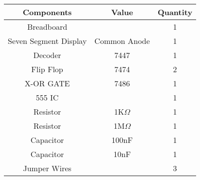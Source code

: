 
\begin{tabular}{|c|c|c|}
\hline
\textbf{Components } & \textbf{Value} & \textbf{Quantity} \\
\hline
Breadboard & & 1 \\
\hline
Seven Segment Display& Common Anode & 1\\
\hline
Decoder & 7447& 1\\
\hline
Flip Flop & 7474& 2\\
\hline
X-OR GATE &7486 & 1\\
\hline
555 IC& & 1\\
\hline
Resistor& 1K$\Omega$ & 1\\
\hline
Resistor &1M$\Omega$  & 1\\
\hline
Capacitor &100nF & 1\\
\hline
Capacitor & 10nF& 1\\
\hline
Jumper Wires & & 3\\
\hline
\end{tabular}


